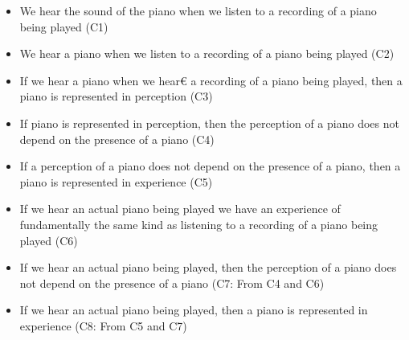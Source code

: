 \documentclass[sloppy, journal, git, bytitle, dodraft]{humapap}
\begin{document}
\begin{itemize}
	\item We hear the sound of the piano when we listen to a recording of a piano being played (C1)
	\item We hear a piano when we listen to a recording of a piano being played (C2)
	\item If we hear a piano when we hear€ a recording of a piano being played, then a piano is represented in perception (C3)
	\item If piano is represented in perception, then the perception of a piano does not depend on the presence of a piano (C4) 
	\item If a perception of a piano does not depend on the presence of a piano, then a piano is represented in experience (C5)
	\item If we hear an actual piano being played we have an experience of fundamentally the same kind as listening to a recording of a piano being played (C6)
	\item If we hear an actual piano being played, then the perception of a piano does not depend on the presence of a piano (C7: From C4 and C6)
	\item If we hear an actual piano being played, then a piano is represented in experience (C8: From C5 and C7)
\end{itemize}




\printbibliography
\end{document}
